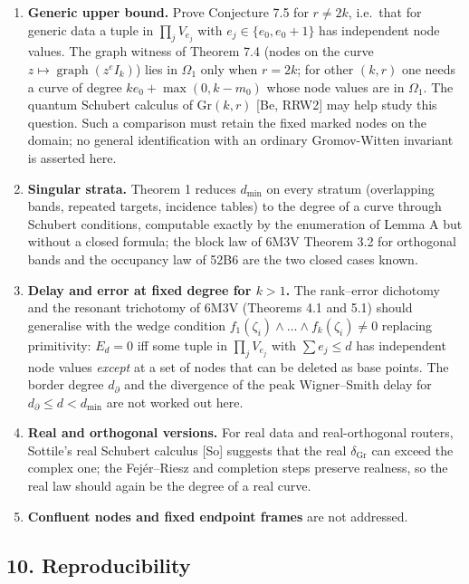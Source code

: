 \documentclass[
  11pt,
  a4paper,
]{article}
\providecommand{\tightlist}{%
  \setlength{\itemsep}{0pt}\setlength{\parskip}{0pt}}
\begin{document}
\begin{enumerate}
\def\labelenumi{\arabic{enumi}.}
\tightlist
\item
  \textbf{Generic upper bound.} Prove Conjecture 7.5 for \(r\ne2k\),
  i.e.~that for generic data a tuple in \(\prod_jV_{e_j}\) with
  \(e_j\in\{e_0,\allowbreak{}e_0+1\}\) has independent node values. The graph witness
  of Theorem 7.4 (nodes on the curve
  \(z\mapsto\operatorname{graph}(z^eI_k)\)) lies in \(\Omega_1\) only
  when \(r=2k\); for other \((k,\allowbreak{}r)\) one needs a curve of degree
  \(ke_0+\max(0,\allowbreak{}k-m_0)\) whose node values are in \(\Omega_1\). The
  quantum Schubert calculus of \(\mathrm{Gr}(k,\allowbreak{}r)\) {[}Be, RRW2{]} may
  help study this question. Such a comparison must retain the fixed
  marked nodes on the domain; no general identification with an ordinary
  Gromov-Witten invariant is asserted here.
\item
  \textbf{Singular strata.} Theorem 1 reduces \(d_{\min}\) on every
  stratum (overlapping bands, repeated targets, incidence tables) to the
  degree of a curve through Schubert conditions, computable exactly by
  the enumeration of Lemma A but without a closed formula; the block law
  of 6M3V Theorem 3.2 for orthogonal bands and the occupancy law of 52B6
  are the two closed cases known.
\item
  \textbf{Delay and error at fixed degree for \(k>1\).} The rank--error
  dichotomy and the resonant trichotomy of 6M3V (Theorems 4.1 and 5.1)
  should generalise with the wedge condition
  \(f_1(\zeta_i)\wedge\dots\wedge f_k(\zeta_i)\ne0\) replacing
  primitivity: \(E_d=0\) iff some tuple in \(\prod_jV_{e_j}\) with
  \(\sum e_j\le d\) has independent node values \emph{except} at a set
  of nodes that can be deleted as base points. The border degree
  \(d_\partial\) and the divergence of the peak Wigner--Smith delay for
  \(d_\partial\le d<d_{\min}\) are not worked out here.
\item
  \textbf{Real and orthogonal versions.} For real data and
  real-orthogonal routers, Sottile's real Schubert calculus {[}So{]}
  suggests that the real \(\delta_{\mathrm{Gr}}\) can exceed the complex
  one; the Fejér--Riesz and completion steps preserve realness, so the
  real law should again be the degree of a real curve.
\item
  \textbf{Confluent nodes and fixed endpoint frames} are not addressed.
\end{enumerate}

\subsection{10. Reproducibility}\label{reproducibility}
\end{document}
